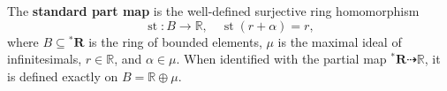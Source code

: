 The \textbf{standard part map} is the well-defined surjective ring homomorphism
$$\operatorname{st} : B \to \mathbb{R}, \quad \operatorname{st}(r + \alpha) = r,$$
where $B \subseteq {^*\mathbf{R}}$ is the ring of bounded elements, $\mu$ is the maximal ideal of infinitesimals, $r \in \mathbb{R}$, and $\alpha \in \mu$. When identified with the partial map ${^*\mathbf{R}} \dashrightarrow \mathbb{R}$, it is defined exactly on $B = \mathbb{R} \oplus \mu$.
